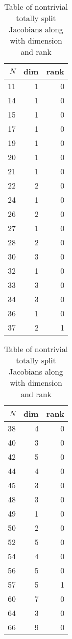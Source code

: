 \begin{table}%
    \label{tab:split}
    \centering
    \caption{Table of nontrivial totally split Jacobians along with dimension
    and rank}
    \begin{tabular}{rrr}
        \toprule
        $N$ & dim & rank\\
        \midrule
        11 & 1 & 0 \\
        14 & 1 & 0 \\
        15 & 1 & 0 \\
        17 & 1 & 0 \\
        19 & 1 & 0 \\
        20 & 1 & 0 \\
        21 & 1 & 0 \\
        22 & 2 & 0 \\
        24 & 1 & 0 \\
        26 & 2 & 0 \\
        27 & 1 & 0 \\
        28 & 2 & 0 \\
        30 & 3 & 0 \\
        32 & 1 & 0 \\
        33 & 3 & 0 \\
        34 & 3 & 0 \\
        36 & 1 & 0 \\
        37 & 2 & 1 \\
        \bottomrule
    \end{tabular}
    \begin{tabular}{rrr}
        \toprule
        $N$ & dim & rank \\
        \midrule
        38 & 4 & 0 \\
        40 & 3 & 0 \\
        42 & 5 & 0 \\
        44 & 4 & 0 \\
        45 & 3 & 0 \\
        48 & 3 & 0 \\
        49 & 1 & 0 \\
        50 & 2 & 0 \\
        52 & 5 & 0 \\
        54 & 4 & 0 \\
        56 & 5 & 0 \\
        57 & 5 & 1 \\
        60 & 7 & 0 \\
        64 & 3 & 0 \\
        66 & 9 & 0 \\

\end{tabular}
\end{table}
